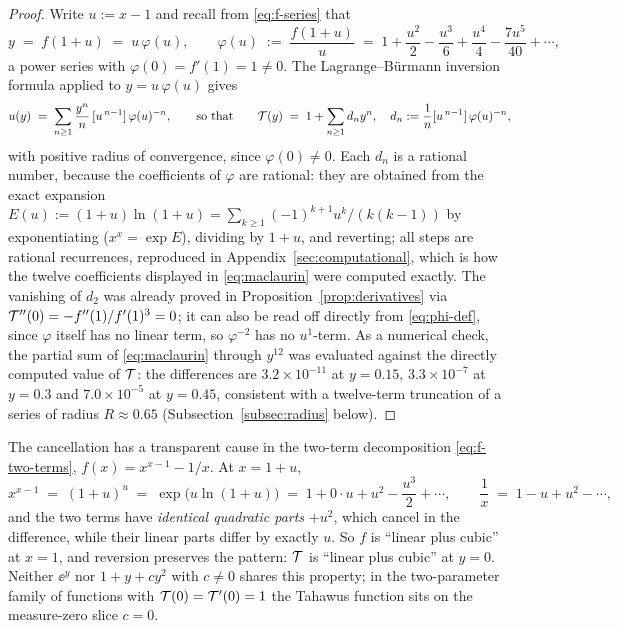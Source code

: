 \begin{proof}
Write $u := x - 1$ and recall from \eqref{eq:f-series} that
\begin{equation}\label{eq:phi-def}
    y \;=\; f(1+u) \;=\; u\,\varphi(u),
    \qquad
    \varphi(u) \;:=\; \frac{f(1+u)}{u}
    \;=\; 1 + \frac{u^{2}}{2} - \frac{u^{3}}{6} + \frac{u^{4}}{4} -
    \frac{7u^{5}}{40} + \cdots,
\end{equation}
a power series with $\varphi(0) = f'(1) = 1 \ne 0$. The
Lagrange--B\"urmann inversion formula applied to $y = u\,\varphi(u)$
gives
\begin{equation}\label{eq:lagrange}
    u(y) \;=\; \sum_{n \ge 1} \frac{y^{n}}{n}\,
    [u^{\,n-1}]\,\varphi(u)^{-n},
    \qquad\text{so that}\qquad
    \mathcal{T}(y) \;=\; 1 + \sum_{n \ge 1} d_{n} y^{n},
    \quad d_{n} := \frac{1}{n}[u^{\,n-1}]\,\varphi(u)^{-n},
\end{equation}
with positive radius of convergence, since $\varphi(0) \ne 0$. Each
$d_n$ is a rational number, because the coefficients of $\varphi$ are
rational: they are obtained from the exact expansion
$E(u) := (1+u)\ln(1+u) = \sum_{k\ge1} (-1)^{k+1}u^{k}/(k(k-1))$ by
exponentiating ($x^{x} = \exp E$), dividing by $1+u$, and reverting;
all steps are rational recurrences, reproduced in
Appendix~\ref{sec:computational}, which is how the twelve coefficients
displayed in \eqref{eq:maclaurin} were computed exactly. The vanishing
of $d_2$ was already proved in Proposition~\ref{prop:derivatives} via
$\mathcal{T}''(0) = -f''(1)/f'(1)^{3} = 0$; it can also be read off directly
from \eqref{eq:phi-def}, since $\varphi$ itself has no linear term, so
$\varphi^{-2}$ has no $u^{1}$-term. As a numerical check, the partial
sum of \eqref{eq:maclaurin} through $y^{12}$ was evaluated against the
directly computed value of $\mathcal{T}$: the differences are
$3.2 \times 10^{-11}$ at $y = 0.15$, $3.3 \times 10^{-7}$ at
$y = 0.3$ and $7.0 \times 10^{-5}$ at $y = 0.45$, consistent with a
twelve-term truncation of a series of radius $R \approx 0.65$
(Subsection~\ref{subsec:radius} below).
\end{proof}

\begin{remark}\label{rem:why-vanishing}
The cancellation has a transparent cause in the two-term decomposition
\eqref{eq:f-two-terms}, $f(x) = x^{x-1} - 1/x$. At $x = 1+u$,
\[
    x^{x-1} \;=\; (1+u)^{u} \;=\; \exp\!\bigl(u\ln(1+u)\bigr)
    \;=\; 1 + 0\cdot u + u^{2} - \frac{u^{3}}{2} + \cdots,
    \qquad
    \frac{1}{x} \;=\; 1 - u + u^{2} - \cdots,
\]
and the two terms have \emph{identical quadratic parts} $+u^{2}$, which
cancel in the difference, while their linear parts differ by exactly
$u$. So $f$ is ``linear plus cubic'' at $x=1$, and reversion preserves
the pattern: $\mathcal{T}$ is ``linear plus cubic'' at $y = 0$. Neither
$\ee^{y}$ nor $1 + y + cy^{2}$ with $c \ne 0$ shares this property; in
the two-parameter family of functions with $\mathcal{T}(0)=\mathcal{T}'(0)=1$ the
Tahawus function sits on the measure-zero slice $c = 0$.
\end{remark}


